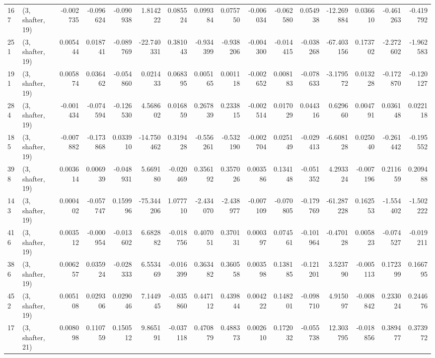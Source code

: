 \begin{tabular}{llrrrrrrrrrrrrrr}
167 &  (3, shafter, 19) &  -0.002735 & -0.096624 & -0.090938 &    1.814222 &  0.085524 &   0.099384 &  0.075750 & -0.006034 & -0.062580 &  0.054938 &   -12.269884 &  0.036610 & -0.461263 & -0.419792 \\
251 &  (3, shafter, 19) &   0.005444 &  0.018741 & -0.089769 &  -22.740331 &  0.381043 &  -0.934399 & -0.938206 & -0.004300 & -0.014415 & -0.038268 &   -67.403156 &  0.173702 & -2.272602 & -1.962583 \\
191 &  (3, shafter, 19) &   0.005874 &  0.036462 & -0.054860 &    0.021433 &  0.068395 &   0.005165 &  0.001118 & -0.002652 &  0.008183 & -0.078633 &    -3.179572 &  0.013228 & -0.172870 & -0.120127 \\
284 &  (3, shafter, 19) &  -0.001434 & -0.074594 & -0.126530 &    4.568602 &  0.016859 &   0.267839 &  0.233815 & -0.002514 &  0.017029 &  0.044316 &     0.629660 &  0.004791 &  0.036148 &  0.022118 \\
185 &  (3, shafter, 19) &  -0.007882 & -0.173868 &  0.033910 &  -14.750462 &  0.319428 &  -0.556261 & -0.532190 & -0.002704 &  0.025149 & -0.029413 &    -6.608128 &  0.025040 & -0.261442 & -0.195552 \\
398 &  (3, shafter, 19) &   0.003614 &  0.006939 & -0.048931 &    5.669180 & -0.020469 &   0.356192 &  0.357026 &  0.003586 &  0.134148 & -0.051352 &     4.293324 & -0.007196 &  0.211659 &  0.209488 \\
143 &  (3, shafter, 19) &   0.000402 & -0.057747 &  0.159996 &  -75.344206 &  1.077710 &  -2.434070 & -2.438977 & -0.007109 & -0.070805 & -0.179769 &   -61.287228 &  0.162553 & -1.554402 & -1.502222 \\
416 &  (3, shafter, 19) &   0.003512 & -0.000954 & -0.013602 &    6.682882 & -0.018756 &   0.407051 &  0.370131 &  0.000397 &  0.074561 & -0.101964 &    -0.470128 &  0.005823 & -0.074527 & -0.019211 \\
386 &  (3, shafter, 19) &   0.006257 &  0.035924 & -0.028333 &    6.553469 & -0.016399 &   0.363482 &  0.360558 &  0.003598 &  0.138185 & -0.121201 &     3.523790 & -0.005113 &  0.172399 &  0.166795 \\
452 &  (3, shafter, 19) &   0.005108 &  0.029306 &  0.029046 &    7.144945 & -0.035860 &   0.447112 &  0.439844 &  0.004222 &  0.148201 & -0.098710 &     4.915097 & -0.008842 &  0.233024 &  0.244676 \\
17  &  (3, shafter, 21) &   0.008098 &  0.110759 &  0.150512 &    9.865191 & -0.037118 &   0.470879 &  0.488373 &  0.002610 &  0.172032 & -0.055738 &    12.303795 & -0.018856 &  0.389477 &  0.373972 \\

\end{tabular}
